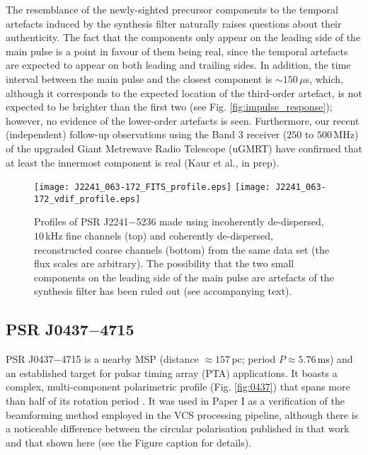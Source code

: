 \documentclass{pasa}%
\newcommand{\psrkaurJ}{J2241$-$5236}
\newcommand{\psrbhatJ}{J0437$-$4715}
\begin{document}
The resemblance of the newly-sighted precursor components to the temporal artefacts induced by the synthesis filter naturally raises questions about their authenticity.
The fact that the components only appear on the leading side of the main pulse is a point in favour of them being real, since the temporal artefacts are expected to appear on both leading and trailing sides.
In addition, the time interval between the main pulse and the closest component is $\sim150\,\mu$s, which, although it corresponds to the expected location of the third-order artefact, is not expected to be brighter than the first two (see Fig. \ref{fig:impulse_response}); however, no evidence of the lower-order artefacts is seen.
Furthermore, our recent (independent) follow-up observations using the Band 3 receiver ($250$ to $500\,$MHz) of the upgraded Giant Metrewave Radio Telescope (uGMRT) have confirmed that at least the innermost component is real (Kaur et al., in prep).

\begin{figure}[t!]
    \centering
    \texttt{[image: J2241\_063-172\_FITS\_profile.eps]}
    \texttt{[image: J2241\_063-172\_vdif\_profile.eps]}
    \caption{Profiles of PSR \psrkaurJ{} made using incoherently de-dispersed, $10\,$kHz fine channels (top) and coherently de-dispersed, reconstructed coarse channels (bottom) from the same data set \citep{Kaur2019} (the flux scales are arbitrary). The possibility that the two small components on the leading side of the main pulse are artefacts of the synthesis filter has been ruled out (see accompanying text).}
    \label{fig:J2241_profiles}
\end{figure}

\subsection{PSR \psrbhatJ{}}

PSR \psrbhatJ{} is a nearby MSP (distance $\approx 157\,$pc; period $P \approx 5.76\,$ms) and an established target for pulsar timing array (PTA) applications.
It boasts a complex, multi-component polarimetric profile (Fig. \ref{fig:0437}) that spans more than half of its rotation period \citep[cf.][]{Yan2011}.
It was used in Paper I as a verification of the beamforming method employed in the VCS processing pipeline, although there is a noticeable difference between the circular polarisation published in that work and that shown here (see the Figure caption for details).
\end{document}
